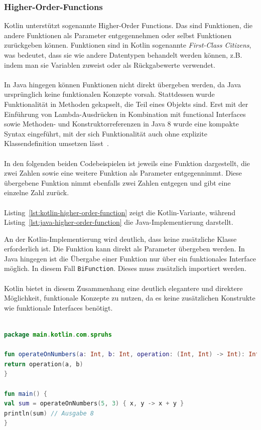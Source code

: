 \documentclass[11pt]{article}
\begin{document}
    \subsubsection{Higher-Order-Functions}
    Kotlin unterstützt sogenannte Higher-Order Functions.
    Das sind Funktionen, die andere Funktionen als Parameter entgegennehmen oder selbst Funktionen zurückgeben können.
    Funktionen sind in Kotlin sogenannte \textit{First-Class Citizens}, was bedeutet, dass sie wie andere Datentypen behandelt werden können, z.B. indem man sie Variablen zuweist oder als Rückgabewerte verwendet.\\
    \\
    In Java hingegen können Funktionen nicht direkt übergeben werden, da Java ursprünglich keine funktionalen Konzepte vorsah.
    Stattdessen wurde Funktionalität in Methoden gekapselt, die Teil eines Objekts sind.
    Erst mit der Einführung von Lambda-Ausdrücken in Kombination mit functional Interfaces sowie Methoden- und Konstruktorreferenzen in Java 8 wurde eine kompakte Syntax eingeführt, mit der sich Funktionalität auch ohne explizite Klassendefinition umsetzen lässt~\cite[820]{insel}.\\
    \\
    In den folgenden beiden Codebeispielen ist jeweils eine Funktion dargestellt, die zwei Zahlen sowie eine weitere Funktion als Parameter entgegennimmt.
    Diese übergebene Funktion nimmt ebenfalls zwei Zahlen entgegen und gibt eine einzelne Zahl zurück.\\
    \\
    Listing~\ref{lst:kotlin-higher-order-function} zeigt die Kotlin-Variante, während Listing~\ref{lst:java-higher-order-function} die Java-Implementierung darstellt.

    An der Kotlin-Implementierung wird deutlich, dass keine zusätzliche Klasse erforderlich ist.
    Die Funktion kann direkt als Parameter übergeben werden.
    In Java hingegen ist die Übergabe einer Funktion nur über ein funktionales Interface möglich.
    In diesem Fall \texttt{BiFunction}.
    Dieses muss zusätzlich importiert werden.\\
    \\
    Kotlin bietet in diesem Zusammenhang eine deutlich elegantere und direktere Möglichkeit, funktionale Konzepte zu nutzen, da es keine zusätzlichen Konstrukte wie funktionale Interfaces benötigt.\\
    \\

    \begin{lstlisting}[language=Kotlin, caption={HigherOrderKotlin.kt}, label={lst:kotlin-higher-order-function}]
package main.kotlin.com.spruhs

fun operateOnNumbers(a: Int, b: Int, operation: (Int, Int) -> Int): Int {
return operation(a, b)
}

fun main() {
val sum = operateOnNumbers(5, 3) { x, y -> x + y }
println(sum) // Ausgabe 8
}
    \end{lstlisting}
\end{document}
